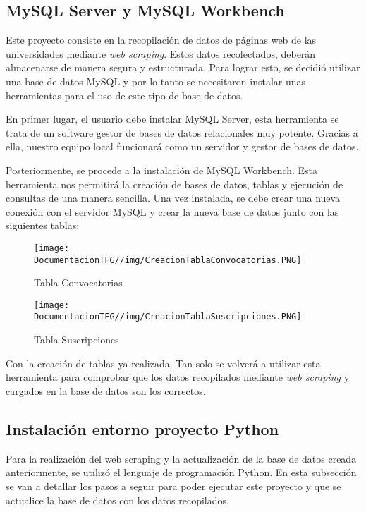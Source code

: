 \subsection{MySQL Server y MySQL Workbench}
Este proyecto consiste en la recopilación de datos de páginas web de las universidades mediante \textit{web scraping}. Estos datos recolectados, deberán almacenarse de manera segura y estructurada. Para lograr esto, se decidió utilizar una base de datos MySQL y por lo tanto se necesitaron instalar unas herramientas para el uso de este tipo de base de datos.

En primer lugar, el usuario debe instalar MySQL Server, esta herramienta se trata de un software gestor de bases de datos relacionales muy potente. Gracias a ella, nuestro equipo local funcionará como un servidor y gestor de bases de datos.

Posteriormente, se procede a la instalación de MySQL Workbench. Esta herramienta nos permitirá la creación de bases de datos, tablas y ejecución de consultas de una manera sencilla. Una vez instalada, se debe crear una nueva conexión con el servidor MySQL y crear la nueva base de datos junto con las siguientes tablas:

\begin{figure}[H]
    \centering
    \texttt{[image: DocumentacionTFG//img/CreacionTablaConvocatorias.PNG]}
    \caption{Tabla Convocatorias}
\end{figure}

\begin{figure}[H]
    \centering
    \texttt{[image: DocumentacionTFG//img/CreacionTablaSuscripciones.PNG]}
    \caption{Tabla Suscripciones}
\end{figure}

Con la creación de tablas ya realizada. Tan solo se volverá a utilizar esta herramienta para comprobar que los datos recopilados mediante \textit{web scraping} y cargados en la base de datos son los correctos.

\subsection{Instalación entorno proyecto Python}
Para la realización del web scraping y la actualización de la base de datos creada anteriormente, se utilizó el lenguaje de programación Python. En esta subsección se van a detallar los pasos a seguir para poder ejecutar este proyecto y que se actualice la base de datos con los datos recopilados.

